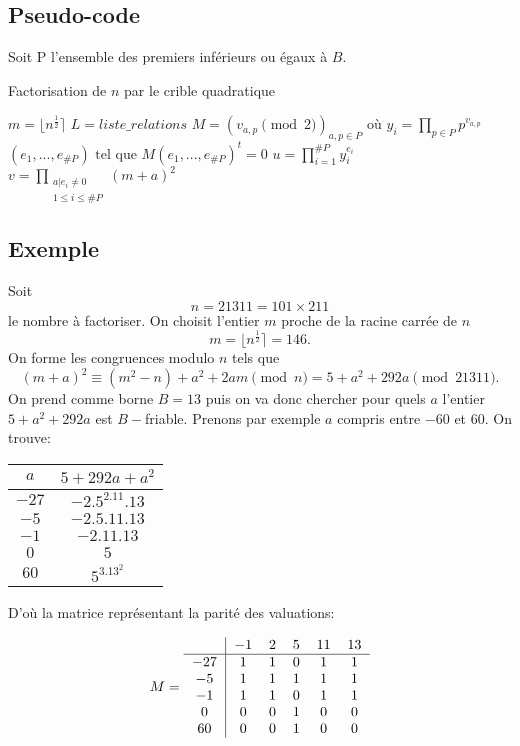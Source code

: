 \documentclass[french, 12pt, titlepage]{article}
\DeclareMathOperator{\pgcd}{pgcd}
\begin{document}
\subsection{Pseudo-code}
Soit P l'ensemble des premiers inférieurs ou égaux à $B.$

\begin{algorithm}
\caption{Factorisation de $n$ par le crible quadratique}
\BlankLine
$m = \lfloor n^{\frac{1}{2}} \rceil$\;
$L = liste\_relations$\;
$M = (v_{a, p} \pmod 2)_{a, p \in P} \text{ où } y_i = \prod\limits_{p \in P}p^{v_{a,p}}$\;
$(e_1, ..., e_{\#P}) \text{ tel que } M(e_1, ..., e_{\#P})^t = 0$\;
$u = \prod\limits_{i = 1}^{\#P} y_i^{e_i}$\;
$v = \prod\limits_{\substack{a | e_i \neq 0 \\ 1 \leq i \leq \#P}}^{} (m + a)^2$\;
\Return{$\pgcd(u - v, n)$}
\end{algorithm}

\subsection{Exemple}

Soit \[n = 21311 = 101 \times 211\] le nombre à factoriser. On choisit l'entier $m$ proche de la racine carrée de $n$ \[ m = \lfloor n^{\frac{1}{2}} \rceil = 146 .\]
On forme les congruences modulo $n$ tels que \[  (m + a)^2 \equiv (m^2 - n) + a^2 + 2am \pmod n = 5 + a^2 + 292a \pmod{21311} .\]
On prend comme borne $B = 13$ puis on va donc chercher pour quels $a$ l'entier $5 + a^2 + 292a$ est $B-$friable. Prenons par exemple $a$ compris entre $-60$ et $60$.
On trouve:

\begin{center}
\begin{tabular}{c|c}
$a$ & $5 + 292a + a^2$\\
\hline
$-27$ & $-2.5^2.11.13$\\
$ -5$ & $-2.5.11.13$\\
$-1$ & $-2.11.13$\\
$0$ & $5$\\
$60$ & $5^3.13^2$\\
\end{tabular}
\end{center}

D'où la matrice représentant la parité des valuations:

\[ M = 
\begin{tabular}{c|ccccc}
 & $-1$ & $2$ & $5$ & $11$ & $13$\\
\hline
$-27$ & $1$ & $1$ & $0$ & $1$ & $1$\\
$ -5$ & $1$ & $1$ & $1$ & $1$ & $1$\\
$-1$ & $1$ & $1$ & $0$ & $1$ & $1$\\
$0$ & $0$ & $0$ & $1$ & $0$ & $0$\\
$60$ & $0$ & $0$ & $1$ & $0$ & $0$\\
\end{tabular}
\]
\end{document}
